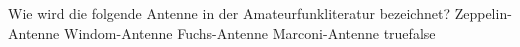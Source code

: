     {Wie wird die folgende Antenne in der Amateurfunkliteratur bezeichnet?  }
    {Zeppelin-Antenne}
    {Windom-Antenne}
    {Fuchs-Antenne}
    {Marconi-Antenne}
    {true}{false}
